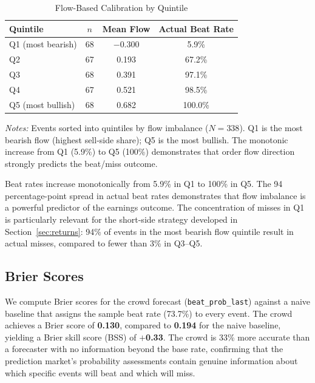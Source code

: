 \documentclass[11pt]{article}
\begin{document}
\begin{table}[htbp]
\centering
\begin{threeparttable}
\caption{Flow-Based Calibration by Quintile}
\label{tab:flow_calibration}
\begin{tabular}{lccc}
\toprule
Quintile & $n$ & Mean Flow & Actual Beat Rate \\
\midrule
Q1 (most bearish) & 68 & $-$0.300 & 5.9\% \\
Q2 & 67 & 0.193 & 67.2\% \\
Q3 & 68 & 0.391 & 97.1\% \\
Q4 & 67 & 0.521 & 98.5\% \\
Q5 (most bullish) & 68 & 0.682 & 100.0\% \\
\bottomrule
\end{tabular}
\begin{tablenotes}
\small
\item \textit{Notes:} Events sorted into quintiles by flow imbalance ($N = 338$). Q1 is the most bearish flow (highest sell-side share); Q5 is the most bullish. The monotonic increase from Q1 (5.9\%) to Q5 (100\%) demonstrates that order flow direction strongly predicts the beat/miss outcome.
\end{tablenotes}
\end{threeparttable}
\end{table}

Beat rates increase monotonically from 5.9\% in Q1 to 100\% in Q5. The 94 percentage-point spread in actual beat rates demonstrates that flow imbalance is a powerful predictor of the earnings outcome. The concentration of misses in Q1 is particularly relevant for the short-side strategy developed in Section~\ref{sec:returns}: 94\% of events in the most bearish flow quintile result in actual misses, compared to fewer than 3\% in Q3--Q5.

\subsection{Brier Scores}

We compute Brier scores for the crowd forecast (\texttt{beat\_prob\_last}) against a naive baseline that assigns the sample beat rate (73.7\%) to every event. The crowd achieves a Brier score of \textbf{0.130}, compared to \textbf{0.194} for the naive baseline, yielding a Brier skill score (BSS) of $+$\textbf{0.33}. The crowd is 33\% more accurate than a forecaster with no information beyond the base rate, confirming that the prediction market's probability assessments contain genuine information about which specific events will beat and which will miss.
\end{document}
